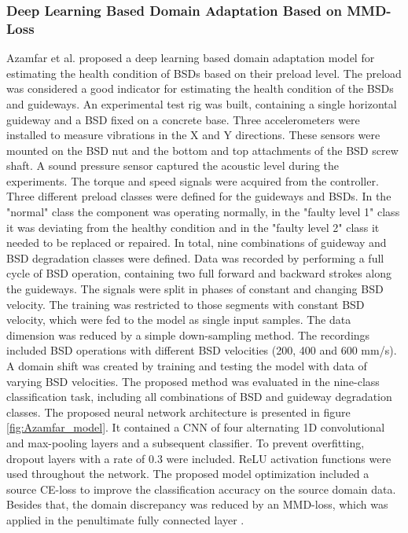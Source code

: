 \subsubsection{Deep Learning Based Domain Adaptation Based on MMD-Loss}
Azamfar et al. \cite{AZAMFAR2020103932} proposed a deep learning based domain adaptation model for estimating the health condition of BSDs based on their preload level. The preload was considered a good indicator for estimating the health condition of the BSDs and guideways. An experimental test rig was built, containing a single horizontal guideway and a BSD fixed on a concrete base. Three accelerometers were installed to measure vibrations in the X and Y directions. These sensors were mounted on the BSD nut and the bottom and top attachments of the BSD screw shaft. A sound pressure sensor captured the acoustic level during the experiments. The torque and speed signals were acquired from the controller. Three different preload classes were defined for the guideways and BSDs. In the "normal" class the component was operating normally, in the "faulty level 1" class it was deviating from the healthy condition and in the "faulty level 2" class it needed to be replaced or repaired. In total, nine combinations of guideway and BSD degradation classes were defined. Data was recorded by performing a full cycle of BSD operation, containing two full forward and backward strokes along the guideways. The signals were split in phases of constant and changing BSD velocity. The training was restricted to those segments with constant BSD velocity, which were fed to the model as single input samples. The data dimension was reduced by a simple down-sampling method. The recordings included BSD operations with different BSD velocities (200, 400 and 600 mm/s). A domain shift was created by training and testing the model with data of varying BSD velocities. The proposed method was evaluated in the nine-class classification task, including all combinations of BSD and guideway degradation classes. The proposed neural network architecture is presented in figure \ref{fig:Azamfar_model}. It contained a CNN of four alternating 1D convolutional and max-pooling layers and a subsequent classifier. To prevent overfitting, dropout layers with a rate of 0.3 were included. ReLU activation functions were used throughout the network. The proposed model optimization included a source CE-loss to improve the classification accuracy on the source domain data. Besides that, the domain discrepancy was reduced by an MMD-loss, which was applied in the penultimate fully connected layer \cite{AZAMFAR2020103932}. 

